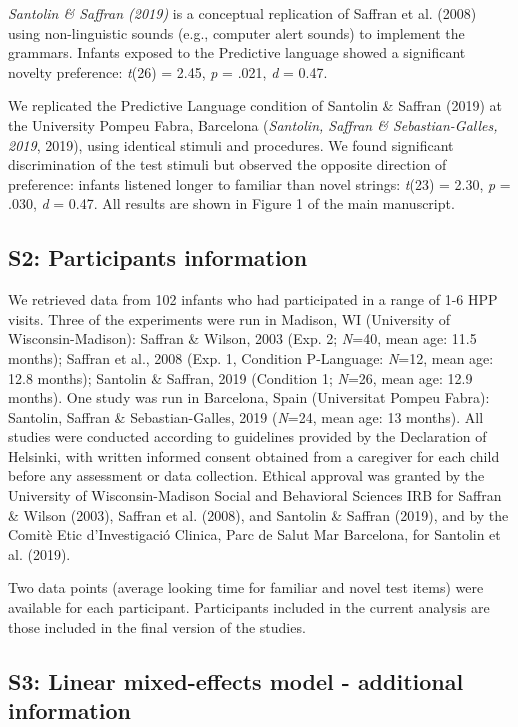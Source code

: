 \begin{appendix}
\emph{Santolin \& Saffran (2019)} is a conceptual replication of Saffran
et al. (2008) using non-linguistic sounds (e.g., computer alert sounds)
to implement the grammars. Infants exposed to the Predictive language
showed a significant novelty preference: \emph{t}(26) = 2.45, \emph{p} =
.021, \emph{d} = 0.47.

We replicated the Predictive Language condition of Santolin \& Saffran
(2019) at the University Pompeu Fabra, Barcelona (\emph{Santolin,
Saffran \& Sebastian-Galles, 2019}, 2019), using identical stimuli and
procedures. We found significant discrimination of the test stimuli but
observed the opposite direction of preference: infants listened longer
to familiar than novel strings: \emph{t}(23) = 2.30, \emph{p} = .030,
\emph{d} = 0.47. All results are shown in Figure 1 of the main
manuscript.

\hypertarget{s2}{%
\subsection{S2: Participants information}\label{s2}}

We retrieved data from 102 infants who had participated in a range of
1-6 HPP visits. Three of the experiments were run in Madison, WI
(University of Wisconsin-Madison): Saffran \& Wilson, 2003 (Exp. 2;
\emph{N}=40, mean age: 11.5 months); Saffran et al., 2008 (Exp. 1,
Condition P-Language: \emph{N}=12, mean age: 12.8 months); Santolin \&
Saffran, 2019 (Condition 1; \emph{N}=26, mean age: 12.9 months). One
study was run in Barcelona, Spain (Universitat Pompeu Fabra): Santolin,
Saffran \& Sebastian-Galles, 2019 (\emph{N}=24, mean age: 13 months).
All studies were conducted according to guidelines provided by the
Declaration of Helsinki, with written informed consent obtained from a
caregiver for each child before any assessment or data collection.
Ethical approval was granted by the University of Wisconsin-Madison
Social and Behavioral Sciences IRB for Saffran \& Wilson (2003), Saffran
et al. (2008), and Santolin \& Saffran (2019), and by the Comitè Etic
d'Investigació Clinica, Parc de Salut Mar Barcelona, for Santolin et al.
(2019).

Two data points (average looking time for familiar and novel test items)
were available for each participant. Participants included in the
current analysis are those included in the final version of the studies.

\hypertarget{s3}{%
\subsection{S3: Linear mixed-effects model - additional
information}\label{s3}}


\end{appendix}
